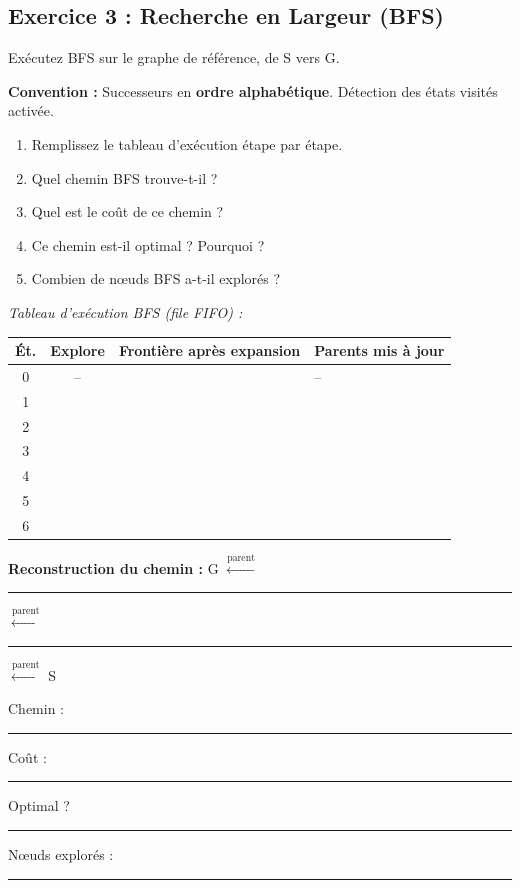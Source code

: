 \documentclass[11pt,a4paper]{article}
\begin{document}
\subsection*{Exercice 3 : Recherche en Largeur (BFS)}

\begin{exercicebox}[Énoncé]
Exécutez BFS sur le graphe de référence, de S vers G.

\textbf{Convention :} Successeurs en \textbf{ordre alphabétique}. Détection des états visités activée.

\begin{enumerate}
    \item Remplissez le tableau d'exécution étape par étape.
    \item Quel chemin BFS trouve-t-il ?
    \item Quel est le coût de ce chemin ?
    \item Ce chemin est-il optimal ? Pourquoi ?
    \item Combien de nœuds BFS a-t-il explorés ?
\end{enumerate}
\end{exercicebox}

\noindent\textit{Tableau d'exécution BFS (file FIFO) :}

{\small
\begin{center}
\renewcommand{\arraystretch}{2.0}
\begin{tabular}{|c|c|l|l|}
\hline
\textbf{Ét.} & \textbf{Explore} & \textbf{Frontière après expansion} & \textbf{Parents mis à jour} \\
\hline
0 & -- & & -- \\
\hline
1 & & & \\
\hline
2 & & & \\
\hline
3 & & & \\
\hline
4 & & & \\
\hline
5 & & & \\
\hline
6 & & & \\
\hline
\end{tabular}
\end{center}
}

\noindent \textbf{Reconstruction du chemin :} G $\xleftarrow{\text{parent}}$ \rule{1cm}{0.4pt} $\xleftarrow{\text{parent}}$ \rule{1cm}{0.4pt} $\xleftarrow{\text{parent}}$ S

\noindent Chemin : \rule{5cm}{0.4pt} \quad Coût : \rule{2cm}{0.4pt} \quad Optimal ? \rule{2cm}{0.4pt} \quad Nœuds explorés : \rule{1.5cm}{0.4pt}
\end{document}
